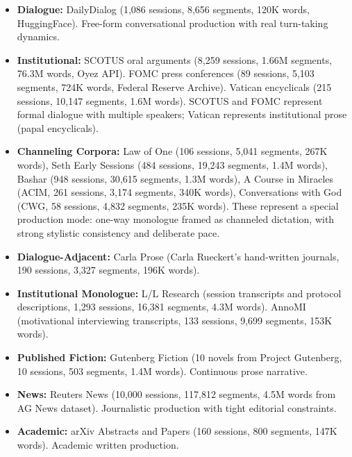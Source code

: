 \documentclass[11pt]{article}
\begin{document}
\begin{itemize}
\item \textbf{Dialogue:} DailyDialog (1,086 sessions, 8,656 segments, 120K words, HuggingFace). Free-form conversational production with real turn-taking dynamics.

\item \textbf{Institutional:} SCOTUS oral arguments (8,259 sessions, 1.66M segments, 76.3M words, Oyez API). FOMC press conferences (89 sessions, 5,103 segments, 724K words, Federal Reserve Archive). Vatican encyclicals (215 sessions, 10,147 segments, 1.6M words). SCOTUS and FOMC represent formal dialogue with multiple speakers; Vatican represents institutional prose (papal encyclicals).

\item \textbf{Channeling Corpora:} Law of One (106 sessions, 5,041 segments, 267K words), Seth Early Sessions (484 sessions, 19,243 segments, 1.4M words), Bashar (948 sessions, 30,615 segments, 1.3M words), A Course in Miracles (ACIM, 261 sessions, 3,174 segments, 340K words), Conversations with God (CWG, 58 sessions, 4,832 segments, 235K words). These represent a special production mode: one-way monologue framed as channeled dictation, with strong stylistic consistency and deliberate pace.

\item \textbf{Dialogue-Adjacent:} Carla Prose (Carla Rueckert's hand-written journals, 190 sessions, 3,327 segments, 196K words).

\item \textbf{Institutional Monologue:} L/L Research (session transcripts and protocol descriptions, 1,293 sessions, 16,381 segments, 4.3M words). AnnoMI (motivational interviewing transcripts, 133 sessions, 9,699 segments, 153K words).

\item \textbf{Published Fiction:} Gutenberg Fiction (10 novels from Project Gutenberg, 10 sessions, 503 segments, 1.4M words). Continuous prose narrative.

\item \textbf{News:} Reuters News (10,000 sessions, 117,812 segments, 4.5M words from AG News dataset). Journalistic production with tight editorial constraints.

\item \textbf{Academic:} arXiv Abstracts and Papers (160 sessions, 800 segments, 147K words). Academic written production.

\end{itemize}
\end{document}
